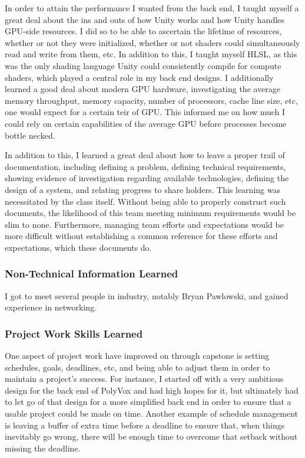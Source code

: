 \documentclass[onecolumn, draftclsnofoot,10pt, compsoc]{IEEEtran}
\begin{document}
In order to attain the performance I wanted from the back end, I taught myself a great deal about the ins and outs of how Unity works and how Unity handles GPU-side resources. I did so to be able to ascertain the lifetime of resources, whether or not they were initialized, whether or not shaders could simultaneously read and write from them, etc. In addition to this, I taught myself HLSL, as this was the only shading language Unity could consistently compile for compute shaders, which played a central role in my back end designs. I additionally learned a good deal about modern GPU hardware, investigating the average memory throughput, memory capacity, number of processors, cache line size, etc, one would expect for a certain teir of GPU. This informed me on how much I could rely on certain capabilities of the average GPU before processes become bottle necked.

In addition to this, I learned a great deal about how to leave a proper trail of documentation, including defining a problem, defining technical requirements, showing evidence of investigation regarding available technologies, defining the design of a system, and relating progress to share holders. This learning was necessitated by the class itself. Without being able to properly construct such documents, the likelihood of this team meeting minimum requirements would be slim to none. Furthermore, managing team efforts and expectations would be more difficult without establishing a common reference for these efforts and expectations, which these documents do.


\subsubsection{Non-Technical Information Learned}

I got to meet several people in industry, notably Bryan Pawlowski, and gained experience in networking.


\subsubsection{Project Work Skills Learned}

One aspect of project work have improved on through capstone is setting schedules, goals, deadlines, etc, and being able to adjust them in order to maintain a project’s success. For instance, I started off with a very ambitious design for the back end of PolyVox and had high hopes for it, but ultimately had to let go of that design for a more simplified back end in order to ensure that a usable project could be made on time. Another example of schedule management is leaving a buffer of extra time before a deadline to ensure that, when things inevitably go wrong, there will be enough time to overcome that setback without missing the deadline.
\end{document}
